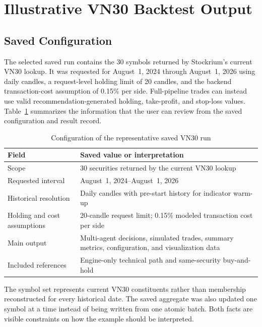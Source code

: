 \section{Illustrative VN30 Backtest Output}
\label{sec:illustrative-vn30-output}

\subsection{Saved Configuration}
\label{subsec:illustrative-vn30-configuration}

The selected saved run contains the 30 symbols returned by Stockrium's current VN30 lookup. It was requested for August~1, 2024 through August~1, 2026 using daily candles, a request-level holding limit of 20 candles, and the backend transaction-cost assumption of 0.15\% per side. Full-pipeline trades can instead use valid recommendation-generated holding, take-profit, and stop-loss values. Table~\ref{tab:illustrative-run-configuration} summarizes the information that the user can review from the saved configuration and result record.

\begin{table}[H]
    \centering
    \caption{Configuration of the representative saved VN30 run}
    \label{tab:illustrative-run-configuration}
    \small
    \renewcommand{\arraystretch}{1.2}
    \begin{tabularx}{\textwidth}{>{\raggedright\arraybackslash}p{4.1cm} X}
        \toprule
        \textbf{Field} & \textbf{Saved value or interpretation} \\
        \midrule
        Scope & 30 securities returned by the current VN30 lookup \\
        Requested interval & August~1, 2024--August~1, 2026 \\
        Historical resolution & Daily candles with pre-start history for indicator warm-up \\
        Holding and cost assumptions & 20-candle request limit; 0.15\% modeled transaction cost per side \\
        Main output & Multi-agent decisions, simulated trades, summary metrics, configuration, and visualization data \\
        Included references & Engine-only technical path and same-security buy-and-hold \\
        \bottomrule
    \end{tabularx}
\end{table}

The symbol set represents current VN30 constituents rather than membership reconstructed for every historical date. The saved aggregate was also updated one symbol at a time instead of being written from one atomic batch. Both facts are visible constraints on how the example should be interpreted.


